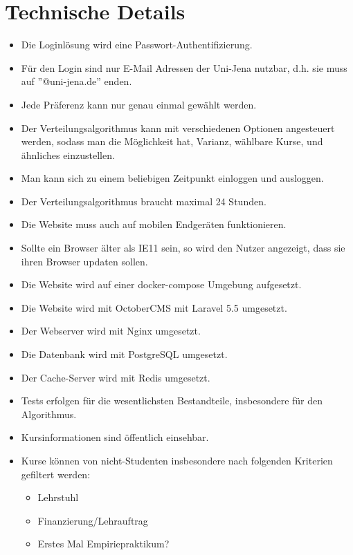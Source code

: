 \documentclass[12pt,a4paper]{article}
\begin{document}
    \section{Technische Details}
    \begin{itemize}
    \item Die Loginlösung wird eine Passwort-Authentifizierung. %
    \item Für den Login sind nur E-Mail Adressen der Uni-Jena nutzbar, d.h. sie muss auf ''@uni-jena.de'' enden.
    \item Jede Präferenz kann nur genau einmal gewählt werden. %
    \item Der Verteilungsalgorithmus kann mit verschiedenen Optionen angesteuert werden, sodass man die Möglichkeit hat, Varianz, wählbare Kurse, und ähnliches einzustellen.
    \item Man kann sich zu einem beliebigen Zeitpunkt einloggen und ausloggen.
    \item Der Verteilungsalgorithmus braucht maximal 24 Stunden.
    \item Die Website muss auch auf mobilen Endgeräten funktionieren.
    \item Sollte ein Browser älter als IE11 sein, so wird den Nutzer angezeigt, dass sie ihren Browser updaten sollen.
    \item Die Website wird auf einer docker-compose Umgebung aufgesetzt.
    \item Die Website wird mit OctoberCMS mit Laravel 5.5 umgesetzt.
    \item Der Webserver wird mit Nginx umgesetzt.
    \item Die Datenbank wird mit PostgreSQL umgesetzt.
    \item Der Cache-Server wird mit Redis umgesetzt.
    \item Tests erfolgen für die wesentlichsten Bestandteile, insbesondere für den Algorithmus.
    \item Kursinformationen sind öffentlich einsehbar.
    \item Kurse können von nicht-Studenten insbesondere nach folgenden Kriterien gefiltert werden: 
        \begin{itemize}
        \item Lehrstuhl
        \item Finanzierung/Lehrauftrag
        \item Erstes Mal Empiriepraktikum?
        \end{itemize}
    \end{itemize}
\end{document}
